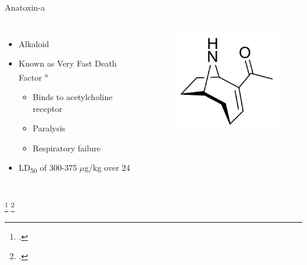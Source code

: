 \begin{frame}{Anatoxin-a}
\begin{columns}
	\begin{itemize}
		\item Alkaloid 
		\item Known as Very Fast Death Factor \textsuperscript{a}
			\begin{itemize}
				\item Binds to acetylcholine receptor
				\item Paralysis 
				\item Respiratory failure
			\end{itemize}
		\item LD\textsubscript{50} of 300-375 $\mu$g/kg over 24 
	\end{itemize}
	\begin{figure}
		\centering
		\includegraphics[width=2in]{anatoxin.png}
	\end{figure}
	\hspace*{-3cm}
\end{columns}
\footcitetext{[a], codd_cyanobacterial_1999}
\footcitetext{[b], shaw_cylindrospermopsin_2000}
\end{frame}
